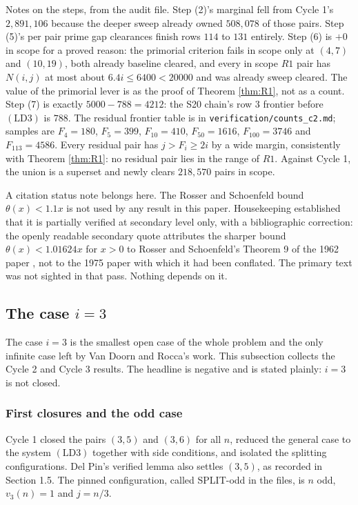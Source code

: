 \documentclass[11pt]{article}
\theoremstyle{remark}
\newcommand{\LDthree}{\ensuremath{\mathrm{(LD3)}}}
\begin{document}
Notes on the steps, from the audit file. Step (2)'s marginal fell from Cycle 1's $2{,}891{,}106$ because the deeper sweep already owned $508{,}078$ of those pairs. Step (5)'s per pair prime gap clearances finish rows $114$ to $131$ entirely. Step (6) is $+0$ in scope for a proved reason: the primorial criterion fails in scope only at $(4,7)$ and $(10,19)$, both already baseline cleared, and every in scope $R1$ pair has $N(i,j)$ at most about $6.4i\le 6400<20000$ and was already sweep cleared. The value of the primorial lever is as the proof of Theorem \ref{thm:R1}, not as a count. Step (7) is exactly $5000-788=4212$: the S20 chain's row $3$ frontier before \LDthree{} is $788$. The residual frontier table is in \texttt{verification/counts\_c2.md}; samples are $F_4=180$, $F_5=399$, $F_{10}=410$, $F_{50}=1616$, $F_{100}=3746$ and $F_{113}=4586$. Every residual pair has $j>F_i\ge 2i$ by a wide margin, consistently with Theorem \ref{thm:R1}: no residual pair lies in the range of $R1$. Against Cycle 1, the union is a superset and newly clears $218{,}570$ pairs in scope.

A citation status note belongs here. The Rosser and Schoenfeld bound $\theta(x)<1.1x$ is not used by any result in this paper. Housekeeping established that it is partially verified at secondary level only, with a bibliographic correction: the openly readable secondary quote attributes the sharper bound $\theta(x)<1.01624x$ for $x>0$ to Rosser and Schoenfeld's Theorem 9 of the 1962 paper \cite{RS1962}, not to the 1975 paper with which it had been conflated. The primary text was not sighted in that pass. Nothing depends on it.


\subsection{The case $i=3$}

The case $i=3$ is the smallest open case of the whole problem and the only infinite case left by Van Doorn and Rocca's work. This subsection collects the Cycle 2 and Cycle 3 results. The headline is negative and is stated plainly: $i=3$ is not closed.

\subsubsection{First closures and the odd case}

Cycle 1 closed the pairs $(3,5)$ and $(3,6)$ for all $n$, reduced the general case to the system \LDthree{} together with side conditions, and isolated the splitting configurations. Del Pin's verified lemma also settles $(3,5)$, as recorded in Section 1.5. The pinned configuration, called SPLIT-odd in the files, is $n$ odd, $v_3(n)=1$ and $j=n/3$.
\end{document}

